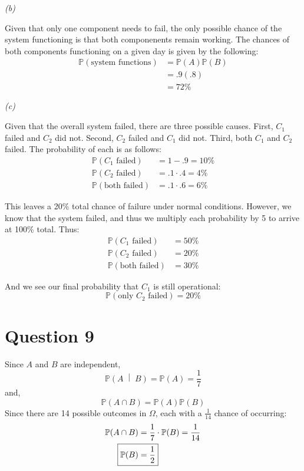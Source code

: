 \documentclass[titlepage, 12pt, leqno]{article}
\begin{document}
\textit{(b)} 

Given that only one component needs to fail, the only possible chance of the system functioning is that both componenents remain working. The chances of both components functioning on a given day is given by the following:
\begin{align*}
    \mathbb{P}(\text{system functions}) &= \mathbb{P}(A)\mathbb{P}(B) \\
                                       &= .9(.8) \\
    &= \boxed{72\%} 
\end{align*}

\textit{(c)} 

Given that the overall system failed, there are three possible causes. First, $C_1$ failed and $C_2$ did not. Second, $C_2$ failed and $C_1$ did not. Third, both $C_1$ and $C_2$ failed. The probability of each is as follows:
\begin{align*}
    \mathbb{P}(C_1\text{ failed}) &= 1 - .9 = 10\% \\
    \mathbb{P}(C_2\text{ failed}) &= .1 \cdot .4 = 4\% \\
    \mathbb{P}(\text{both failed}) &= .1 \cdot .6 = 6\%
\end{align*}

This leaves a 20\% total chance of failure under normal conditions. However, we know that the system failed, and thus we multiply each probability by 5 to arrive at 100\% total. Thus:
\begin{align*}
    \mathbb{P}(C_1\text{ failed}) &= 50\% \\
    \mathbb{P}(C_2\text{ failed}) &= 20\% \\
    \mathbb{P}(\text{both failed}) &= 30\%
\end{align*}

And we see our final probability that $C_1$ is still operational:
\[
    \boxed{\mathbb{P}(\text{only }C_2 \text{ failed}) = 20\%}
\]
\pagebreak
\section{Question 9}
Since $A$ and $B$ are independent,
\[
    \mathbb{P}\left(A \;\middle|\; B\right) = \mathbb{P}(A) = \frac{1}{7} 
\]
and,
\[
    \mathbb{P}(A \cap B) = \mathbb{P}(A)\mathbb{P}(B)
\]
Since there are 14 possible outcomes in $\Omega$, each with a $\frac{1}{14}$ chance of occurring:
\begin{align*}
    \mathbb{P}(A \cap B) &= \frac{1}{7} \cdot \mathbb{P}(B) = \frac{1}{14} \\
    \Aboxed{\mathbb{P}(B) &= \frac{1}{2}} 
\end{align*}
\pagebreak
\end{document}
